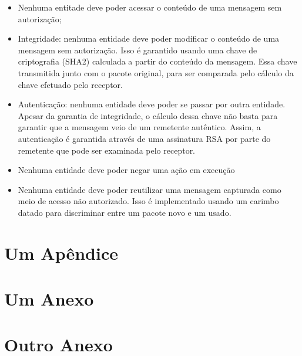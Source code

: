 \documentclass[tcc,capa]{texufpel}
\begin{document}
\begin{itemize}
        \item Nenhuma entitade deve poder acessar o conteúdo de uma mensagem sem autorização;
        \item Integridade: nenhuma entidade deve poder modificar o conteúdo de uma mensagem sem autorização. Isso é garantido usando uma chave de criptografia (SHA2) calculada a
                partir do conteúdo da mensagem. Essa chave transmitida junto com o pacote original, para ser comparada pelo cálculo da chave efetuado pelo receptor.
        \item Autenticação: nenhuma entidade deve poder se passar por outra entidade. Apesar da garantia de integridade, o cálculo dessa chave não basta para garantir que a
                mensagem veio de um remetente autêntico. Assim, a autenticação é garantida através de uma assinatura RSA por parte do remetente que pode ser examinada pelo
                receptor.
        \item Nenhuma entidade deve poder negar uma ação em execução
        \item Nenhuma entidade deve poder reutilizar uma mensagem capturada como meio de acesso não autorizado. Isso é implementado usando um carimbo datado para discriminar entre
                um pacote novo e um usado.
\end{itemize}



 

\apendices
\chapter{Um Apêndice}

\anexos
\chapter{Um Anexo}


\chapter{Outro Anexo}
\end{document}
